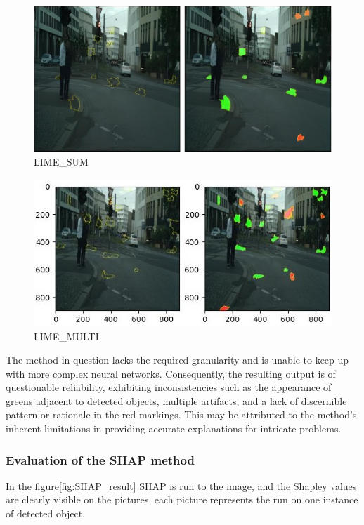 \begin{figure}[h]
    \centering
    \includegraphics[width=\textwidth]{figures/best-box_bonn_000035_000019_leftImg8bit}
    \caption{LIME\_SUM}
    \label{fig:LIME1}
\end{figure}
\hfill
\begin{figure}[h]
    \centering
    \includegraphics[width=\textwidth]{figures/best-box_bonn_000035_000019_leftImg8bit_MULTI}
    \caption{LIME\_MULTI}
    \label{fig:LIME2}
\end{figure}

The method in question lacks the required granularity and is unable to keep up with more complex neural networks.
Consequently, the resulting output is of questionable reliability, exhibiting inconsistencies such as the appearance of greens adjacent to detected objects, multiple artifacts, and a lack of discernible pattern or rationale in the red markings.
This may be attributed to the method's inherent limitations in providing accurate explanations for intricate problems.
\newpage
\subsubsection{Evaluation of the SHAP method}\label{subsubsec:evaluation-of-the-shap-method}
In the figure\ref{fig:SHAP_result} SHAP is run to the image, and the Shapley values are clearly visible on the pictures, each picture represents the run on one instance of detected object.

